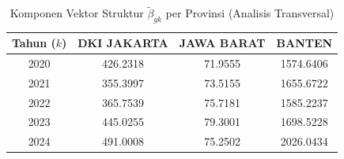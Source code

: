 \begin{table}[H]
\centering
\small
\caption{Komponen Vektor Struktur $\tilde{\beta}_{gk}$ per Provinsi (Analisis Transversal)} \label{tab:appbeta_provinsi}
\begin{tabular}{|c|c|c|c|}
\hline
\textbf{Tahun ($k$)} & \textbf{DKI JAKARTA} & \textbf{JAWA BARAT} & \textbf{BANTEN} \\
\hline
2020 & 426.2318 & 71.9555 & 1574.6406 \\
2021 & 355.3997 & 73.5155 & 1655.6722 \\
2022 & 365.7539 & 75.7181 & 1585.2237 \\
2023 & 445.0255 & 79.3001 & 1698.5228 \\
2024 & 491.0008 & 75.2502 & 2026.0434 \\
\hline
\end{tabular}
\end{table}